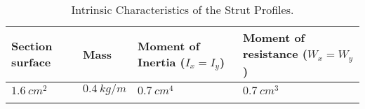 
\begin{longtable}{|m{}|m{}|m{}|m{}|}
\hline
\textbf{Section surface} & \textbf{Mass} & \textbf{Moment of Inertia ($I_x = I_y$)} & \textbf{Moment of resistance ($W_x = W_y$)} \\ \hline 
$1.6\ cm^2$ & $0.4\ kg/m$ & $0.7\ cm^4$ & $0.7\ cm^3$ \\ \hline

\caption{Intrinsic Characteristics of the Strut Profiles.}
\label{table:profile_momentum}
\end{longtable}